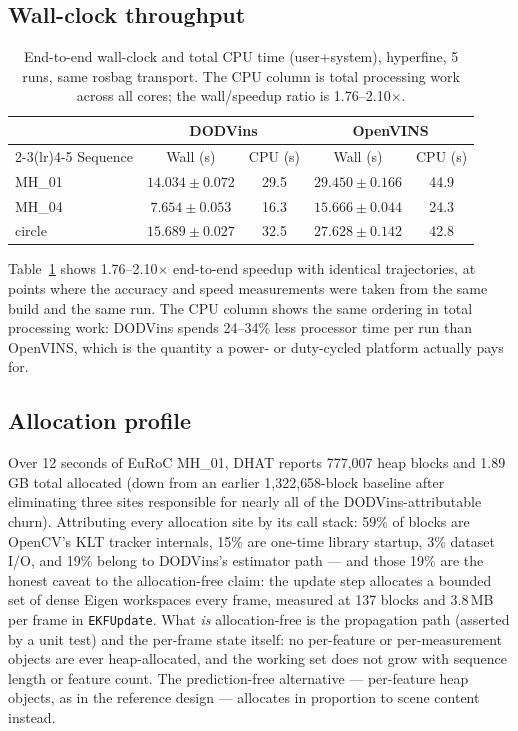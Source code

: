 \documentclass[10pt,conference,letterpaper]{IEEEtran}
\begin{document}
\subsection{Wall-clock throughput}

\begin{table}[t]
\caption{End-to-end wall-clock and total CPU time (user+system), hyperfine,
5 runs, same rosbag transport. The CPU column is total processing work
across all cores; the wall/speedup ratio is 1.76--2.10$\times$.}
\label{tab:speed}
\centering
\begin{tabular}{lcccc}
\toprule
 & \multicolumn{2}{c}{DODVins} & \multicolumn{2}{c}{OpenVINS} \\
\cmidrule(lr){2-3}\cmidrule(lr){4-5}
Sequence & Wall (s) & CPU (s) & Wall (s) & CPU (s) \\
\midrule
MH\_01 & $14.034 \pm 0.072$ & 29.5 & $29.450 \pm 0.166$ & 44.9 \\
MH\_04 & $7.654 \pm 0.053$ & 16.3 & $15.666 \pm 0.044$ & 24.3 \\
circle & $15.689 \pm 0.027$ & 32.5 & $27.628 \pm 0.142$ & 42.8 \\
\bottomrule
\end{tabular}
\end{table}

Table~\ref{tab:speed} shows 1.76--2.10$\times$ end-to-end speedup with
identical trajectories, at points where the accuracy and speed measurements
were taken from the same build and the same run. The CPU column shows the
same ordering in total processing work: DODVins spends 24--34\% less
processor time per run than OpenVINS, which is the quantity a power- or
duty-cycled platform actually pays for.

\subsection{Allocation profile}

Over 12 seconds of EuRoC MH\_01, DHAT reports 777{,}007 heap blocks and
1.89\,GB total allocated (down from an earlier 1{,}322{,}658-block baseline
after eliminating three sites responsible for nearly all of the
DODVins-attributable churn). Attributing every allocation site by its call
stack: 59\% of blocks are OpenCV's KLT tracker internals, 15\% are
one-time library startup, 3\% dataset I/O, and 19\% belong to DODVins's
estimator path --- and those 19\% are the honest caveat to the
allocation-free claim: the update step allocates a bounded set of dense
Eigen workspaces every frame, measured at 137 blocks and 3.8\,MB per frame
in \texttt{EKFUpdate}. What \emph{is} allocation-free is the propagation
path (asserted by a unit test) and the per-frame state itself: no
per-feature or per-measurement objects are ever heap-allocated, and the
working set does not grow with sequence length or feature count. The
prediction-free alternative --- per-feature heap objects, as in the
reference design --- allocates in proportion to scene content instead.
\end{document}
